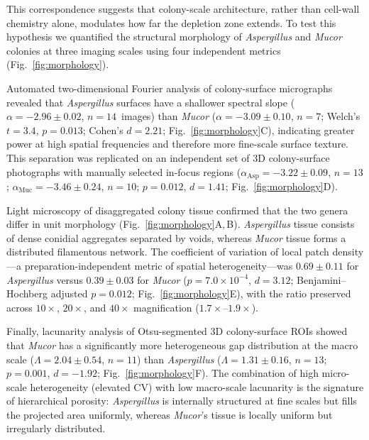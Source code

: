 This correspondence suggests that colony-scale architecture, rather
than cell-wall chemistry alone, modulates how far the depletion zone
extends.  To test this hypothesis we quantified the structural
morphology of \textit{Aspergillus} and \textit{Mucor} colonies at
three imaging scales using four independent metrics
(Fig.~\ref{fig:morphology}).

Automated two-dimensional Fourier analysis of colony-surface
micrographs revealed that \textit{Aspergillus} surfaces have a
shallower spectral slope ($\alpha = -2.96 \pm 0.02$, $n = 14$~images)
than \textit{Mucor} ($\alpha = -3.09 \pm 0.10$, $n = 7$; Welch's
$t = 3.4$, $p = 0.013$; Cohen's $d = 2.21$;
Fig.~\ref{fig:morphology}C), indicating greater power at high spatial
frequencies and therefore more fine-scale surface texture.  This
separation was replicated on an independent set of 3D colony-surface
photographs with manually selected in-focus regions
($\alpha_{\mathrm{Asp}} = -3.22 \pm 0.09$, $n = 13$;
$\alpha_{\mathrm{Muc}} = -3.46 \pm 0.24$, $n = 10$; $p = 0.012$,
$d = 1.41$; Fig.~\ref{fig:morphology}D).

Light microscopy of disaggregated colony tissue confirmed that
the two genera differ in unit morphology
(Fig.~\ref{fig:morphology}A,\,B).  \textit{Aspergillus} tissue
consists of dense conidial aggregates separated by voids, whereas
\textit{Mucor} tissue forms a distributed filamentous network.
The coefficient of variation of local patch density---a
preparation-independent metric of spatial heterogeneity---was
$0.69 \pm 0.11$ for \textit{Aspergillus} versus
$0.39 \pm 0.03$ for \textit{Mucor}
($p = 7.0 \times 10^{-4}$, $d = 3.12$;
Benjamini--Hochberg adjusted $p = 0.012$;
Fig.~\ref{fig:morphology}E), with the ratio preserved across
$10\times$, $20\times$, and $40\times$ magnification
($1.7\times$--$1.9\times$).

Finally, lacunarity analysis of Otsu-segmented 3D colony-surface
ROIs showed that \textit{Mucor} has a significantly more
heterogeneous gap distribution at the macro scale
($\Lambda = 2.04 \pm 0.54$, $n = 11$) than \textit{Aspergillus}
($\Lambda = 1.31 \pm 0.16$, $n = 13$; $p = 0.001$,
$d = -1.92$; Fig.~\ref{fig:morphology}F).  The combination of
high micro-scale heterogeneity (elevated CV) with low macro-scale
lacunarity is the signature of hierarchical porosity:
\textit{Aspergillus} is internally structured at fine scales but
fills the projected area uniformly, whereas \textit{Mucor}'s
tissue is locally uniform but irregularly distributed.


